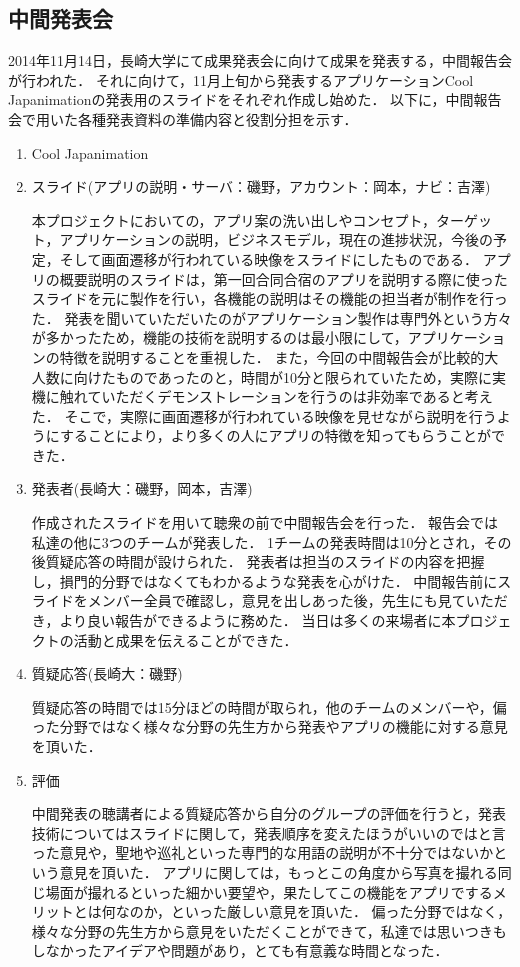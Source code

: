 \subsection{中間発表会} 
\par
2014年11月14日，長崎大学にて成果発表会に向けて成果を発表する，中間報告会が行われた．
それに向けて，11月上旬から発表するアプリケーションCool Japanimationの発表用のスライドをそれぞれ作成し始めた．
以下に，中間報告会で用いた各種発表資料の準備内容と役割分担を示す．
\begin{enumerate}
\item Cool Japanimation　
\par
\item スライド(アプリの説明・サーバ：磯野，アカウント：岡本，ナビ：吉澤) 
\par
本プロジェクトにおいての，アプリ案の洗い出しやコンセプト，ターゲット，アプリケーションの説明，ビジネスモデル，現在の進捗状況，今後の予定，そして画面遷移が行われている映像をスライドにしたものである．
アプリの概要説明のスライドは，第一回合同合宿のアプリを説明する際に使ったスライドを元に製作を行い，各機能の説明はその機能の担当者が制作を行った．
発表を聞いていただいたのがアプリケーション製作は専門外という方々が多かったため，機能の技術を説明するのは最小限にして，アプリケーションの特徴を説明することを重視した．
また，今回の中間報告会が比較的大人数に向けたものであったのと，時間が10分と限られていたため，実際に実機に触れていただくデモンストレーションを行うのは非効率であると考えた．
そこで，実際に画面遷移が行われている映像を見せながら説明を行うようにすることにより，より多くの人にアプリの特徴を知ってもらうことができた．
\item 発表者(長崎大：磯野，岡本，吉澤)
\par
作成されたスライドを用いて聴衆の前で中間報告会を行った．
報告会では私達の他に3つのチームが発表した．
1チームの発表時間は10分とされ，その後質疑応答の時間が設けられた．
発表者は担当のスライドの内容を把握し，損門的分野ではなくてもわかるような発表を心がけた．
中間報告前にスライドをメンバー全員で確認し，意見を出しあった後，先生にも見ていただき，より良い報告ができるように務めた．
当日は多くの来場者に本プロジェクトの活動と成果を伝えることができた． 
\item 質疑応答(長崎大：磯野) 
\par
質疑応答の時間では15分ほどの時間が取られ，他のチームのメンバーや，偏った分野ではなく様々な分野の先生方から発表やアプリの機能に対する意見を頂いた． 
\item 評価 
\par
中間発表の聴講者による質疑応答から自分のグループの評価を行うと，発表技術についてはスライドに関して，発表順序を変えたほうがいいのではと言った意見や，聖地や巡礼といった専門的な用語の説明が不十分ではないかという意見を頂いた．
アプリに関しては，もっとこの角度から写真を撮れる同じ場面が撮れるといった細かい要望や，果たしてこの機能をアプリでするメリットとは何なのか，といった厳しい意見を頂いた．
偏った分野ではなく，様々な分野の先生方から意見をいただくことができて，私達では思いつきもしなかったアイデアや問題があり，とても有意義な時間となった．
\end{enumerate}　
\par
{}
